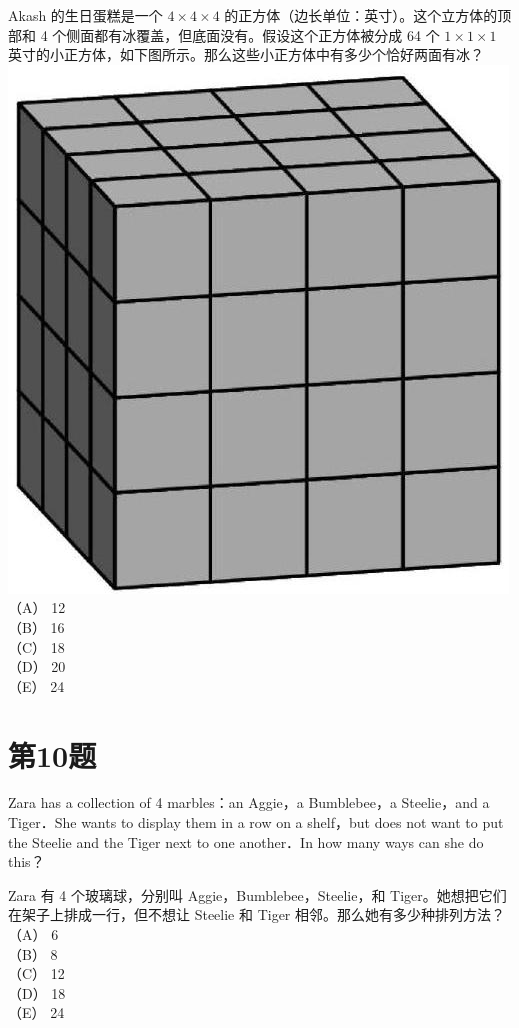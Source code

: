 \documentclass[10pt]{article}
\begin{document}
Akash 的生日蛋糕是一个 $4 \times 4 \times 4$ 的正方体（边长单位：英寸）。这个立方体的顶部和 4 个侧面都有冰覆盖，但底面没有。假设这个正方体被分成 64 个 $1 \times 1 \times 1$ 英寸的小正方体，如下图所示。那么这些小正方体中有多少个恰好两面有冰？\\
\includegraphics[max width=\textwidth, center]{2025_09_05_48544237b06df716137eg-05}\\
（A） 12\\
（B） 16\\
（C） 18\\
（D） 20\\
（E） 24

\section*{第10题}
Zara has a collection of 4 marbles：an Aggie，a Bumblebee，a Steelie，and a Tiger．She wants to display them in a row on a shelf，but does not want to put the Steelie and the Tiger next to one another．In how many ways can she do this？

Zara 有 4 个玻璃球，分别叫 Aggie，Bumblebee，Steelie，和 Tiger。她想把它们在架子上排成一行，但不想让 Steelie 和 Tiger 相邻。那么她有多少种排列方法？\\
（A） 6\\
（B） 8\\
（C） 12\\
（D） 18\\
（E） 24
\end{document}
